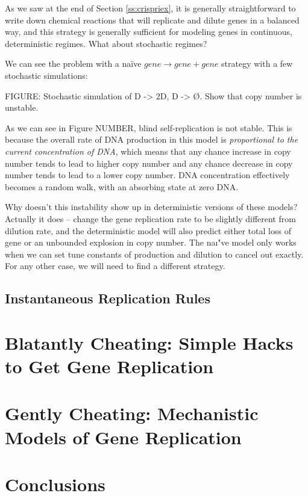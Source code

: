 \documentclass[preprint,12pt]{elsarticle}
\begin{document}
As we saw at the end of Section \ref{ss:crispriex}, it is generally straightforward to write down chemical reactions that will replicate and dilute genes in a balanced way, and this strategy is generally sufficient for modeling genes in continuous, deterministic regimes. What about stochastic regimes? 

We can see the problem with a na\"ive $gene \rightarrow gene + gene$ strategy with a few stochastic simulations:

\vspace{.5in}
FIGURE: Stochastic simulation of D -> 2D, D -> Ø. Show that copy number is unstable. 
\vspace{.5in}

As we can see in Figure {NUMBER}, blind self-replication is not stable. This is because the overall rate of DNA production in this model is \emph{proportional to the current concentration of DNA}, which means that any chance increase in copy number tends to lead to higher copy number and any chance decrease in copy number tends to lead to a lower copy number. DNA concentration effectively becomes a random walk, with an absorbing state at zero DNA. 

Why doesn't this instability show up in deterministic versions of these models? Actually it does -- change the gene replication rate to be slightly different from dilution rate, and the deterministic model will also predict either total loss of gene or an unbounded explosion in copy number. The na\i"ve model only works when we can set tune constants of production and dilution to cancel out exactly. For any other case, we will need to find a different strategy.

\subsection{Instantaneous Replication Rules}



\section{Blatantly Cheating: Simple Hacks to Get Gene Replication}\label{S:hackmodels}

\section{Gently Cheating: Mechanistic Models of Gene Replication}\label{S:mechmodels}

\section{Conclusions} \label{S:conclusions}
\end{document}
